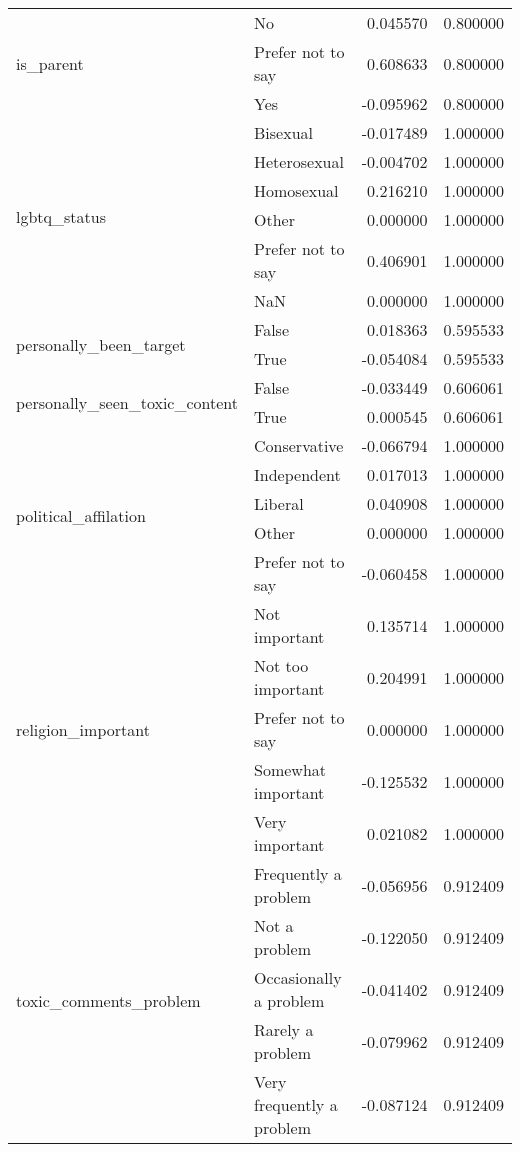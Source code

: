 \begin{longtable}{llrr}
\cline{1-4}
\multirow[t]{3}{*}{is\_parent} & No & 0.045570 & 0.800000 \\
 & Prefer not to say & 0.608633 & 0.800000 \\
 & Yes & -0.095962 & 0.800000 \\
\cline{1-4}
\multirow[t]{6}{*}{lgbtq\_status} & Bisexual & -0.017489 & 1.000000 \\
 & Heterosexual & -0.004702 & 1.000000 \\
 & Homosexual & 0.216210 & 1.000000 \\
 & Other & 0.000000 & 1.000000 \\
 & Prefer not to say & 0.406901 & 1.000000 \\
 & NaN & 0.000000 & 1.000000 \\
\cline{1-4}
\multirow[t]{2}{*}{personally\_been\_target} & False & 0.018363 & 0.595533 \\
 & True & -0.054084 & 0.595533 \\
\cline{1-4}
\multirow[t]{2}{*}{personally\_seen\_toxic\_content} & False & -0.033449 & 0.606061 \\
 & True & 0.000545 & 0.606061 \\
\cline{1-4}
\multirow[t]{5}{*}{political\_affilation} & Conservative & -0.066794 & 1.000000 \\
 & Independent & 0.017013 & 1.000000 \\
 & Liberal & 0.040908 & 1.000000 \\
 & Other & 0.000000 & 1.000000 \\
 & Prefer not to say & -0.060458 & 1.000000 \\
\cline{1-4}
\multirow[t]{5}{*}{religion\_important} & Not important & 0.135714 & 1.000000 \\
 & Not too important & 0.204991 & 1.000000 \\
 & Prefer not to say & 0.000000 & 1.000000 \\
 & Somewhat important & -0.125532 & 1.000000 \\
 & Very important & 0.021082 & 1.000000 \\
\cline{1-4}
\multirow[t]{5}{*}{toxic\_comments\_problem} & Frequently a problem & -0.056956 & 0.912409 \\
 & Not a problem & -0.122050 & 0.912409 \\
 & Occasionally a problem & -0.041402 & 0.912409 \\
 & Rarely a problem & -0.079962 & 0.912409 \\
 & Very frequently a problem & -0.087124 & 0.912409 \\
\cline{1-4}
\end{longtable}
